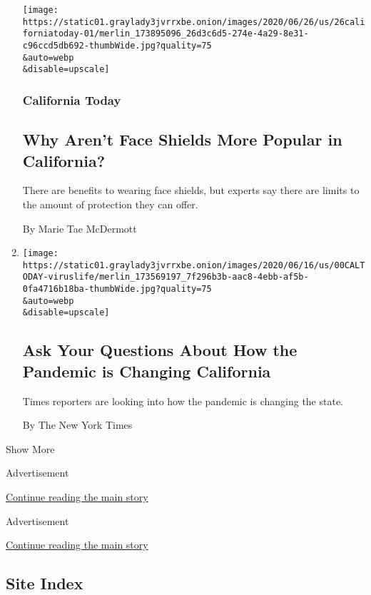 \begin{enumerate}
  \texttt{[image: https://static01.graylady3jvrrxbe.onion/images/2020/06/26/us/26californiatoday-01/merlin\_173895096\_26d3c6d5-274e-4a29-8e31-c96ccd5db692-thumbWide.jpg?quality=75\\\&auto=webp\\\&disable=upscale]}

  \hypertarget{california-today-8}{%
  \subsubsection{California Today}\label{california-today-8}}

  \hypertarget{why-arent-face-shields-more-popular-in-california}{%
  \subsection{Why Aren't Face Shields More Popular in
  California?}\label{why-arent-face-shields-more-popular-in-california}}

  There are benefits to wearing face shields, but experts say there are
  limits to the amount of protection they can offer.

  By Marie Tae McDermott
\item
  \href{/2020/06/17/us/coronavirus-california-life.html}{}

  \texttt{[image: https://static01.graylady3jvrrxbe.onion/images/2020/06/16/us/00CALTODAY-viruslife/merlin\_173569197\_7f296b3b-aac8-4ebb-af5b-0fa4716b18ba-thumbWide.jpg?quality=75\\\&auto=webp\\\&disable=upscale]}

  \hypertarget{ask-your-questions-about-how-the-pandemic-is-changing-california}{%
  \subsection{Ask Your Questions About How the Pandemic is Changing
  California}\label{ask-your-questions-about-how-the-pandemic-is-changing-california}}

  Times reporters are looking into how the pandemic is changing the
  state.

  By The New York Times
\end{enumerate}

Show More

Advertisement

\protect\hyperlink{after-mid1}{Continue reading the main story}

Advertisement

\protect\hyperlink{after-mktg}{Continue reading the main story}

\hypertarget{site-index}{%
\subsection{Site Index}\label{site-index}}

